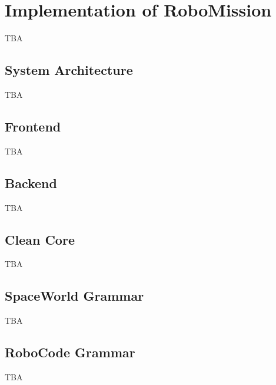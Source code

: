 \chapter{Implementation of RoboMission}
\label{chap:implementation-of-robomission}

TBA

\section{System Architecture}

TBA

\section{Frontend}

TBA


\section{Backend}

TBA

\section{Clean Core}

TBA


\section{SpaceWorld Grammar}

TBA


\section{RoboCode Grammar}

TBA
